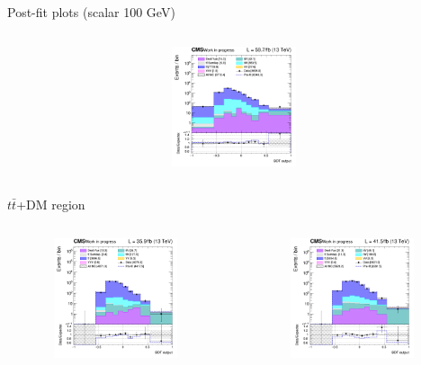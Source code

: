 \documentclass[8pt]{beamer}
\begin{document}
\begin{frame}{Post-fit plots (scalar 100 GeV)}
\begin{columns}
\begin{column}{0.33\textwidth}
\begin{center}
     			\includegraphics[width=1.0\textwidth, height=100pt]{figs/postfits/2018/log_cratio_ST_topCR_ll_BDT_tDM100_TTbar_BDT_output_scalar100_customBinsAttempt7.png}
    		\end{center}		
		\end{column}
\end{columns}

\vspace{-8pt}
\begin{columns}
\begin{column}{1.09\textwidth}
\begin{block}{\centering $t \bar t$+DM region}\end{block} \vspace{10pt}
\end{column}
\end{columns} \vspace{-16pt}
\begin{columns}
		\begin{column}{0.33\textwidth}
			\begin{center}
     			\includegraphics[width=1.0\textwidth, height=100pt]{figs/postfits/2016/log_cratio_TTbar_topCR_ll_BDT_ttDM100_TTbar_BDT_output_scalar100_customBinsAttempt7.png}
    		\end{center}		
		\end{column}
		\begin{column}{0.33\textwidth}
			\begin{center}
     			\includegraphics[width=1.0\textwidth, height=100pt]{figs/postfits/2017/log_cratio_TTbar_topCR_ll_BDT_ttDM100_TTbar_BDT_output_scalar100_customBinsAttempt7.png}

\end{center}
\end{column}
\end{columns}
\end{frame}
\end{document}
